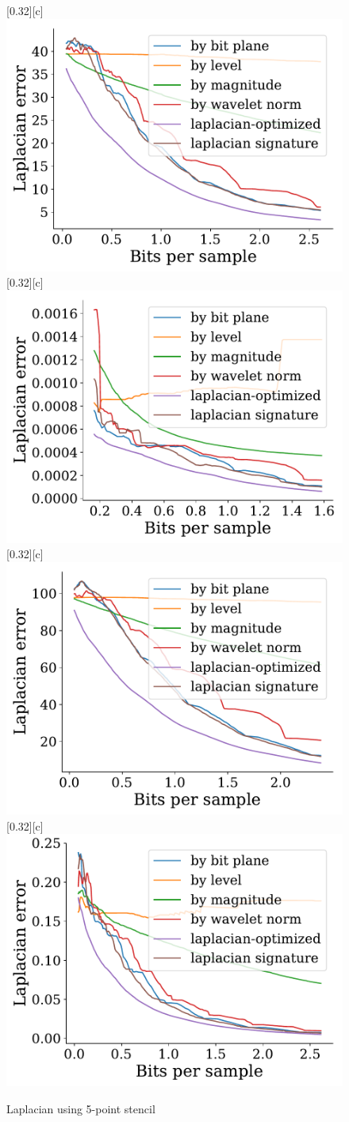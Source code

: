 \documentclass{article}
\begin{document}
\begin{figure}[htb]
        [0.32\linewidth][c]{%
                \includegraphics[width=0.3\linewidth]{img/supplementary/laplacian-optimized-vismale}}
        [0.32\linewidth][c]{%
                \includegraphics[width=0.3\linewidth]{img/supplementary/laplacian-optimized-karfs}}
        [0.32\linewidth][c]{%
                \includegraphics[width=0.3\linewidth]{img/supplementary/laplacian-optimized-aneurism}}
        [0.32\linewidth][c]{%
                \includegraphics[width=0.3\linewidth]{img/supplementary/laplacian-optimized-velocityz}}
        \caption{Laplacian using 5-point stencil}
\end{figure}
\end{document}
